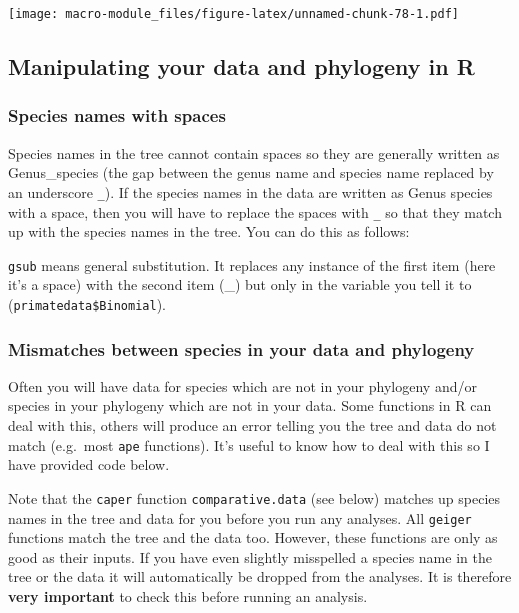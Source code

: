\documentclass[]{book}
\newenvironment{Shaded}{\begin{snugshade}}{\end{snugshade}}
\newcommand{\KeywordTok}[1]{\textcolor[rgb]{0.13,0.29,0.53}{\textbf{{#1}}}}
\newcommand{\StringTok}[1]{\textcolor[rgb]{0.31,0.60,0.02}{{#1}}}
\newcommand{\NormalTok}[1]{{#1}}
\begin{document}
\texttt{[image: macro-module\_files/figure-latex/unnamed-chunk-78-1.pdf]}

\subsection{Manipulating your data and phylogeny in
R}\label{manipulating-your-data-and-phylogeny-in-r}

\subsubsection{Species names with
spaces}\label{species-names-with-spaces}

Species names in the tree cannot contain spaces so they are generally
written as Genus\_species (the gap between the genus name and species
name replaced by an underscore \texttt{\_}). If the species names in the
data are written as Genus species with a space, then you will have to
replace the spaces with \texttt{\_} so that they match up with the
species names in the tree. You can do this as follows:

\begin{Shaded}
\end{Shaded}

\texttt{gsub} means general substitution. It replaces any instance of
the first item (here it's a space) with the second item (\_) but only in
the variable you tell it to (\texttt{primatedata\$Binomial}).

\subsubsection{Mismatches between species in your data and
phylogeny}\label{mismatches-between-species-in-your-data-and-phylogeny}

Often you will have data for species which are not in your phylogeny
and/or species in your phylogeny which are not in your data. Some
functions in R can deal with this, others will produce an error telling
you the tree and data do not match (e.g.~most \texttt{ape} functions).
It's useful to know how to deal with this so I have provided code below.

Note that the \texttt{caper} function \texttt{comparative.data} (see
below) matches up species names in the tree and data for you before you
run any analyses. All \texttt{geiger} functions match the tree and the
data too. However, these functions are only as good as their inputs. If
you have even slightly misspelled a species name in the tree or the data
it will automatically be dropped from the analyses. It is therefore
\textbf{very important} to check this before running an analysis.
\end{document}
